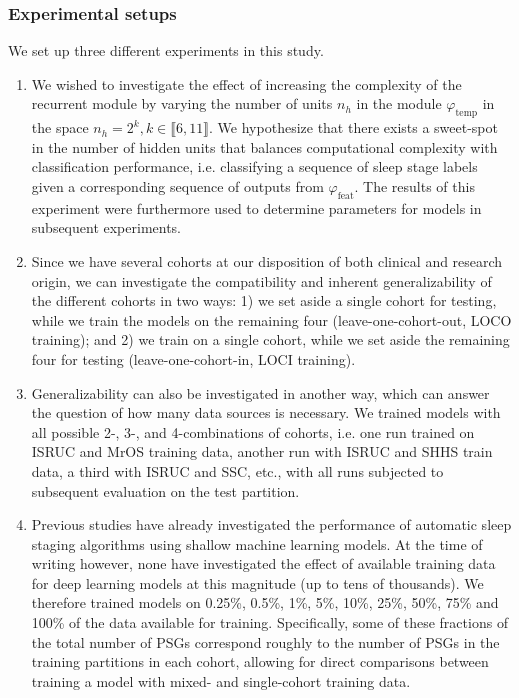 \subsubsection{Experimental setups}
We set up three different experiments in this study.
\begin{enumerate}
    \item We wished to investigate the effect of increasing the complexity of the recurrent module by varying the number of units $n_h$ in the module $\varphi_{\mathrm{temp}}$ in the space $n_h=2^k, k \in \llbracket 6, 11 \rrbracket$.
    We hypothesize that there exists a sweet-spot in the number of hidden units that balances computational complexity with classification performance, i.e. classifying a sequence of sleep stage labels given a corresponding sequence of outputs from $\varphi_{\mathrm{feat}}$.
    The results of this experiment were furthermore used to determine parameters for models in subsequent experiments.
    \item Since we have several cohorts at our disposition of both clinical and research origin, we can investigate the compatibility and inherent generalizability of the different cohorts in two ways: 1) we set aside a single cohort for testing, while we train the models on the remaining four (leave-one-cohort-out, LOCO training); and 2) we train on a single cohort, while we set aside the remaining four for testing (leave-one-cohort-in, LOCI training).
    \item Generalizability can also be investigated in another way, which can answer the question of how many data sources is necessary.
    We trained models with all possible 2-, 3-, and 4-combinations of cohorts, i.e. one run trained on ISRUC and MrOS training data, another run with ISRUC and SHHS train data, a third with ISRUC and SSC, etc., with all runs subjected to subsequent evaluation on the test partition. 
    \item Previous studies have already investigated the performance of automatic sleep staging algorithms using shallow machine learning models.
    At the time of writing however, none have investigated the effect of available training data for deep learning models at this magnitude (up to tens of thousands).
    We therefore trained models on 0.25\%, 0.5\%, 1\%, 5\%, 10\%, 25\%, 50\%, 75\% and 100\% of the data available for training.
    Specifically, some of these fractions of the total number of PSGs correspond roughly to the number of PSGs in the training partitions in each cohort, allowing for direct comparisons between training a model with mixed- and single-cohort training data.
\end{enumerate}

